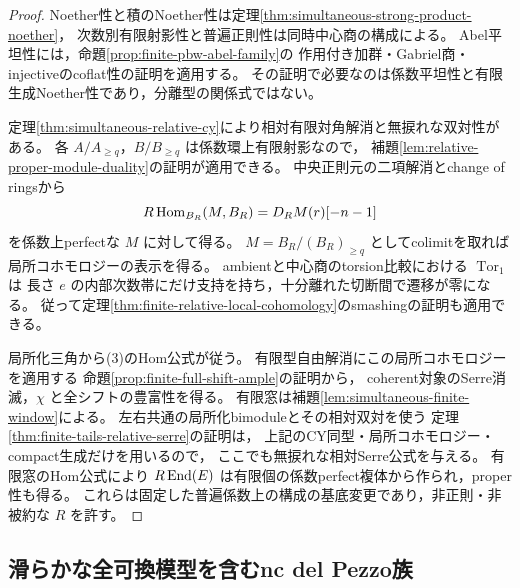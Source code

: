 \begin{proof}
Noether性と積のNoether性は定理\ref{thm:simultaneous-strong-product-noether}，
次数別有限射影性と普遍正則性は同時中心商の構成による。
Abel平坦性には，命題\ref{prop:finite-pbw-abel-family}の
作用付き加群・Gabriel商・injectiveのcoflat性の証明を適用する。
その証明で必要なのは係数平坦性と有限生成Noether性であり，分離型の関係式ではない。

定理\ref{thm:simultaneous-relative-cy}により相対有限対角解消と無捩れな双対性がある。
各 $A/A_{\ge q}$，$B/B_{\ge q}$ は係数環上有限射影なので，
補題\ref{lem:relative-proper-module-duality}の証明が適用できる。
中央正則元の二項解消とchange of ringsから
\[
 R\operatorname{Hom}_{B_R}(M,B_R)=D_RM(r)[-n-1]
\]
を係数上perfectな $M$ に対して得る。
$M=B_R/(B_R)_{\ge q}$ としてcolimitを取れば局所コホモロジーの表示を得る。
ambientと中心商のtorsion比較における $\operatorname{Tor}_1$ は
長さ $e$ の内部次数帯にだけ支持を持ち，十分離れた切断間で遷移が零になる。
従って定理\ref{thm:finite-relative-local-cohomology}のsmashingの証明も適用できる。

局所化三角から(3)のHom公式が従う。
有限型自由解消にこの局所コホモロジーを適用する
命題\ref{prop:finite-full-shift-ample}の証明から，
coherent対象のSerre消滅，$\chi$ と全シフトの豊富性を得る。
有限窓は補題\ref{lem:simultaneous-finite-window}による。
左右共通の局所化bimoduleとその相対双対を使う
定理\ref{thm:finite-tails-relative-serre}の証明は，
上記のCY同型・局所コホモロジー・compact生成だけを用いるので，
ここでも無捩れな相対Serre公式を与える。
有限窓のHom公式により $R\operatorname{End}(E)$ は有限個の係数perfect複体から作られ，proper性も得る。
これらは固定した普遍係数上の構成の基底変更であり，非正則・非被約な $R$ を許す。
\end{proof}

\subsection{滑らかな全可換模型を含むnc del Pezzo族}

